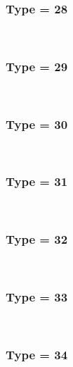 \documentclass{article}
\begin{document}
        
        
            \subsubsection*{Type = 28}    
            
            \\
        
        
        
            \subsubsection*{Type = 29}    
            
            \\
        
        
        
            \subsubsection*{Type = 30}    
            
            \\
        
        
        
            \subsubsection*{Type = 31}    
            
            \\
        
        
        
            \subsubsection*{Type = 32}    
            
            \\
        
        
        
            \subsubsection*{Type = 33}    
            
            \\
        
        
        
            \subsubsection*{Type = 34}    
            
\end{document}
